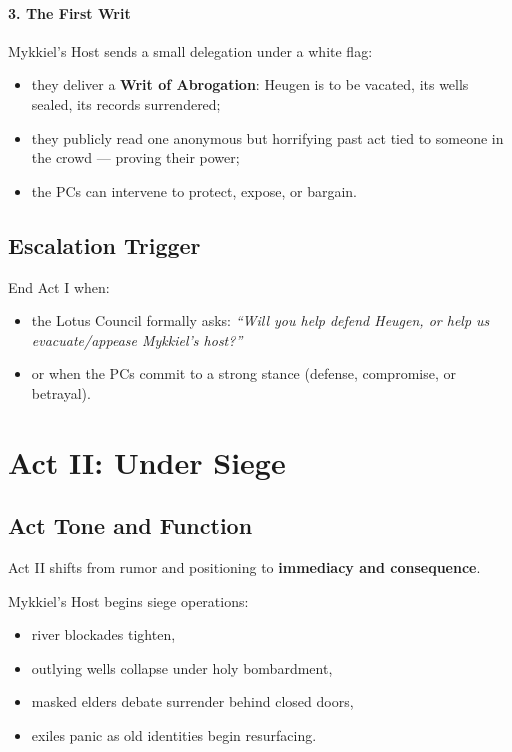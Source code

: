 \documentclass[11pt]{article}
\begin{document}
\paragraph{3. The First Writ}

Mykkiel's Host sends a small delegation under a white flag:
\begin{itemize}[leftmargin=*]
  \item they deliver a \textbf{Writ of Abrogation}: Heugen is to be vacated, its wells sealed, its records surrendered;
  \item they publicly read one anonymous but horrifying past act tied to someone in the crowd --- proving their power;
  \item the PCs can intervene to protect, expose, or bargain.
\end{itemize}

\subsection*{Escalation Trigger}

End Act I when:
\begin{itemize}[leftmargin=*]
  \item the Lotus Council formally asks: \emph{``Will you help defend Heugen, or help us evacuate/appease Mykkiel's host?''}
  \item or when the PCs commit to a strong stance (defense, compromise, or betrayal).
\end{itemize}

\newpage

\section{Act II: Under Siege}
\label{sec:act2}

\subsection*{Act Tone and Function}

Act II shifts from rumor and positioning to \textbf{immediacy and consequence}.

Mykkiel's Host begins siege operations:
\begin{itemize}[leftmargin=*]
  \item river blockades tighten,
  \item outlying wells collapse under holy bombardment,
  \item masked elders debate surrender behind closed doors,
  \item exiles panic as old identities begin resurfacing.
\end{itemize}
\end{document}
